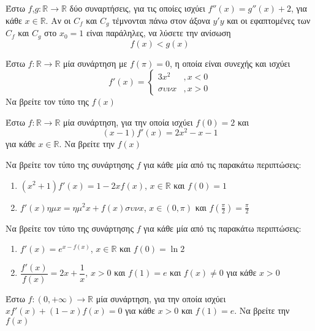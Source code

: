 \documentclass{../presentation}
\begin{document}
\begin{askisi}
  Έστω $f$,$g:\mathbb{R}\to\mathbb{R}$ δύο συναρτήσεις, για τις οποίες ισχύει $f''(x)=g''(x)+2$, για κάθε $x\in\mathbb{R}$. Αν οι $C_f$ και $C_g$ τέμνονται πάνω στον άξονα $y'y$ και οι εφαπτομένες των $C_f$ και $C_g$ στο $x_0=1$ είναι παράληλες, να λύσετε την ανίσωση
  $$f(x)<g(x)$$
\end{askisi}

\begin{askisi}
  Έστω $f:\mathbb{R}\to\mathbb{R}$ μία συνάρτηση με $f(π)=0$, η οποία είναι συνεχής και ισχύει
  $$f'(x)=\begin{cases}
      3x^2 & ,x<0 \\
      συνx & ,x>0
    \end{cases}$$
  Να βρείτε τον τύπο της $f(x)$
\end{askisi}

\begin{askisi}
  Έστω $f:\mathbb{R}\to\mathbb{R}$ μία συνάρτηση, για την οποία ισχύει $f(0)=2$ και
  $$(x-1)f'(x)=2x^2-x-1$$
  για κάθε $x\in\mathbb{R}$. Να βρείτε την $f(x)$
\end{askisi}

\begin{askisi}
  Να βρείτε τον τύπο της συνάρτησης $f$ για κάθε μία από τις παρακάτω περιπτώσεις:
  \begin{enumerate}[<+->]
    \item $(x^2+1)f'(x)=1-2xf(x)$, $x\in\mathbb{R}$ και $f(0)=1$
    \item $f'(x)ημx=ημ^2x+f(x)συνx$, $x\in \left( 0,π \right) $ και $f(\frac{π}{2})=\frac{π}{2}$
  \end{enumerate}
\end{askisi}

\begin{askisi}
  Να βρείτε τον τύπο της συνάρτησης $f$ για κάθε μία από τις παρακάτω περιπτώσεις:
  \begin{enumerate}[<+->]
    \item $f'(x)=e^{x-f(x)}$, $x\in\mathbb{R}$ και $f(0)=\ln 2$
    \item $\dfrac{f'(x)}{f(x)}=2x+\dfrac{1}{x}$, $x>0$ και $f(1)=e$ και $f(x)\ne 0$ για κάθε $x>0$
  \end{enumerate}
\end{askisi}

\begin{askisi}
  Έστω $f:(0,+\infty)\to\mathbb{R}$ μία συνάρτηση, για την οποία ισχύει $xf'(x)+(1-x)f(x)=0$ για κάθε $x>0$ και $f(1)=e$. Να βρείτε την $f(x)$
\end{askisi}
\end{document}
